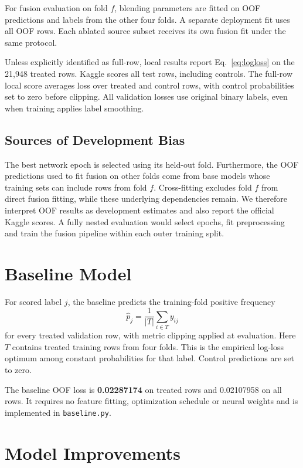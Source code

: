 \documentclass[journal]{IEEEtran}
\begin{document}
For fusion evaluation on fold $f$, blending parameters are fitted on OOF predictions and labels from the other four folds. A separate deployment fit uses all OOF rows. Each ablated source subset receives its own fusion fit under the same protocol.

Unless explicitly identified as full-row, local results report Eq.~\eqref{eq:logloss} on the 21,948 treated rows. Kaggle scores all test rows, including controls. The full-row local score averages loss over treated and control rows, with control probabilities set to zero before clipping. All validation losses use original binary labels, even when training applies label smoothing.

\subsection{Sources of Development Bias}
The best network epoch is selected using its held-out fold. Furthermore, the OOF predictions used to fit fusion on other folds come from base models whose training sets can include rows from fold $f$. Cross-fitting excludes fold $f$ from direct fusion fitting, while these underlying dependencies remain. We therefore interpret OOF results as development estimates and also report the official Kaggle scores. A fully nested evaluation would select epochs, fit preprocessing and train the fusion pipeline within each outer training split.

\section{Baseline Model}
\label{sec:baseline}

For scored label $j$, the baseline predicts the training-fold positive frequency
\begin{equation}
\widehat p_j=\frac{1}{|T|}\sum_{i\in T}y_{ij}
\end{equation}
for every treated validation row, with metric clipping applied at evaluation. Here $T$ contains treated training rows from four folds. This is the empirical log-loss optimum among constant probabilities for that label. Control predictions are set to zero.

The baseline OOF loss is \textbf{0.02287174} on treated rows and 0.02107958 on all rows. It requires no feature fitting, optimization schedule or neural weights and is implemented in \texttt{baseline.py}.

\section{Model Improvements}
\label{sec:improvements}
\end{document}
